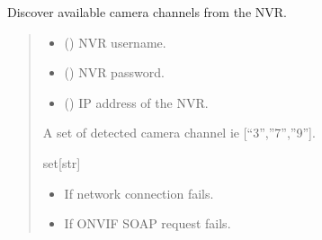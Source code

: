 \documentclass[letterpaper,10pt,english]{sphinxmanual}
\begin{document}

\begin{fulllineitems}
\label{\detokenize{modules/src.data_intake.data_intake.NVRConnection:src.data_intake.data_intake.NVRConnection.getCameraChannels}}
\pysigstartsignatures
\pysiglinewithargsret
{}
{\sphinxparamcomma {}\sphinxparamcomma {}}
{}
\pysigstopsignatures
\sphinxAtStartPar
Discover available camera channels from the NVR.
\begin{quote}\begin{description}
\begin{itemize}
\item {} 
\sphinxAtStartPar
{} () \textendash{} NVR username.

\item {} 
\sphinxAtStartPar
{} () \textendash{} NVR password.

\item {} 
\sphinxAtStartPar
{} () \textendash{} IP address of the NVR.

\end{itemize}

\sphinxAtStartPar
A set of detected camera channel ie {[}“3”,”7”,”9”{]}.

\sphinxAtStartPar
set{[}str{]}

\begin{itemize}
\item {} 
\sphinxAtStartPar
{} \textendash{} If network connection fails.

\item {} 
\sphinxAtStartPar
{} \textendash{} If ONVIF SOAP request fails.


\end{itemize}
\end{description}
\end{quote}
\end{fulllineitems}
\end{document}
